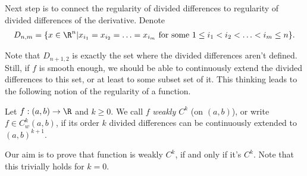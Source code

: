 Next step is to connect the regularity of divided differences to regularity of divided differences of the derivative. Denote
\begin{align*}
	D_{n, m} = \{x \in \R^{n} | x_{i_{1}} = x_{i_{2}} = \ldots = x_{i_{m}} \text{ for some $1 \leq i_{1} < i_{2} < \ldots < i_{m} \leq n$} \}.
\end{align*}

Note that $D_{n + 1, 2}$ is exactly the set where the divided differences aren't defined. Still, if $f$ is smooth enough, we should be able to continuously extend the divided differences to this set, or at least to some subset set of it. This thinking leads to the following notion of the regularity of a function.

\begin{maar}
	Let $f : (a, b) \to \R$ and $k \geq 0$. We call $f$ \textit{weakly $C^{k}$} (on $(a, b)$), or write $f \in C_{w}^{k}(a, b)$, if its order $k$ divided differences can be continuously extended to $(a, b)^{k + 1}$.
\end{maar}

Our aim is to prove that function is weakly $C^{k}$, if and only if it's $C^{k}$. Note that this trivially holds for $k = 0$.


